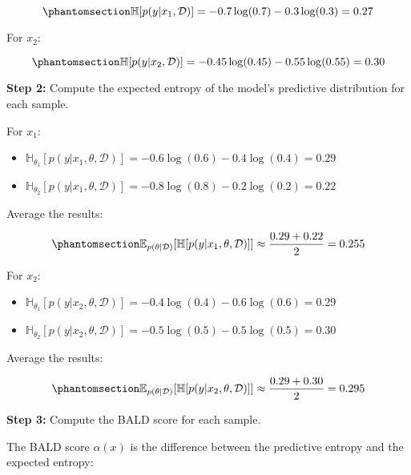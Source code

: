 \documentclass[
  letterpaper,
  numbers=noenddot,
  DIV=11]{scrreprt}
\providecommand{\tightlist}{%
  \setlength{\itemsep}{0pt}\setlength{\parskip}{0pt}}\usepackage{longtable,booktabs,array}
\theoremstyle{definition}
\theoremstyle{plain}
\theoremstyle{plain}
\theoremstyle{remark}
\begin{document}
\begin{equation}\phantomsection\label{eq-eq3.10}{
\mathbb{H}[p(y|x_1, \mathcal{D})] = - 0.7 \log(0.7) - 0.3 \log(0.3) = 0.27
}\end{equation}

For \(x_2\):

\begin{equation}\phantomsection\label{eq-eq3.11}{
\mathbb{H}[p(y|x_2, \mathcal{D})] = - 0.45 \log(0.45) - 0.55 \log(0.55) = 0.30
}\end{equation}

\textbf{Step 2:} Compute the expected entropy of the model's predictive
distribution for each sample.

For \(x_1\):

\begin{itemize}
\tightlist
\item
  \(\mathbb{H}_{\theta_1}[p(y|x_1, \theta, \mathcal{D})] = -0.6 \log(0.6) - 0.4 \log(0.4) = 0.29\)
\item
  \(\mathbb{H}_{\theta_2}[p(y|x_1, \theta, \mathcal{D})] = -0.8 \log(0.8) - 0.2 \log(0.2) = 0.22\)
\end{itemize}

Average the results:

\begin{equation}\phantomsection\label{eq-eq3.12}{
\mathbb{E}_{p(\theta|\mathcal{D})}[\mathbb{H}[p(y|x_1, \theta, \mathcal{D})]] \approx \frac{0.29 + 0.22}{2} = 0.255
}\end{equation}

For \(x_2\):

\begin{itemize}
\tightlist
\item
  \(\mathbb{H}_{\theta_1}[p(y|x_2, \theta, \mathcal{D})] = -0.4 \log(0.4) - 0.6 \log(0.6) = 0.29\)
\item
  \(\mathbb{H}_{\theta_2}[p(y|x_2, \theta, \mathcal{D})] = -0.5 \log(0.5) - 0.5 \log(0.5) = 0.30\)
\end{itemize}

Average the results:

\begin{equation}\phantomsection\label{eq-eq3.13}{
\mathbb{E}_{p(\theta|\mathcal{D})}[\mathbb{H}[p(y|x_2, \theta, \mathcal{D})]] \approx \frac{0.29 + 0.30}{2} = 0.295
}\end{equation}

\textbf{Step 3:} Compute the BALD score for each sample.

The BALD score \(\alpha(x)\) is the difference between the predictive
entropy and the expected entropy:
\end{document}
